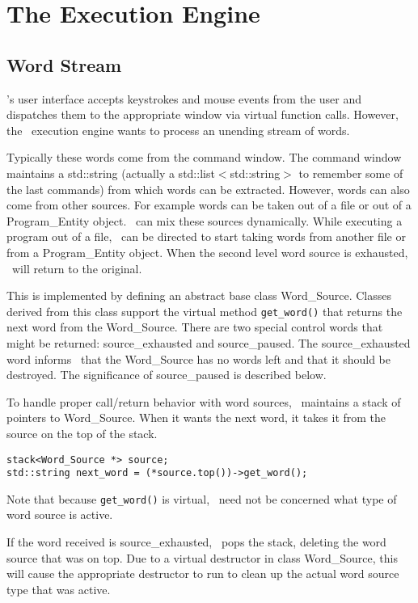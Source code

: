 \documentclass{report}
\begin{document}
\chapter{The Execution Engine}

\section{Word Stream}

\CLAC's user interface accepts keystrokes and mouse events from the user and dispatches them to
the appropriate window via virtual function calls. However, the \CLAC\ execution engine wants to
process an unending stream of words.

Typically these words come from the command window. The command window maintains a std::string
(actually a std::list$<$std::string$>$ to remember some of the last commands) from which words
can be extracted. However, words can also come from other sources. For example words can be
taken out of a file or out of a Program\_Entity object. \CLAC\ can mix these sources
dynamically. While executing a program out of a file, \CLAC\ can be directed to start taking
words from another file or from a Program\_Entity object. When the second level word source is
exhausted, \CLAC\ will return to the original.

This is implemented by defining an abstract base class Word\_Source. Classes derived from this
class support the virtual method \texttt{get\_word()} that returns the next word from the
Word\_Source. There are two special control words that might be returned: source\_exhausted and
source\_paused. The source\_exhausted word informs \CLAC\ that the Word\_Source has no words
left and that it should be destroyed. The significance of source\_paused is described below.

To handle proper call/return behavior with word sources, \CLAC\ maintains a stack of pointers to
Word\_Source. When it wants the next word, it takes it from the source on the top of the stack.

\begin{verbatim}
stack<Word_Source *> source;
std::string next_word = (*source.top())->get_word();
\end{verbatim}

Note that because \texttt{get\_word()} is virtual, \CLAC\ need not be concerned what type of
word source is active.

If the word received is source\_exhausted, \CLAC\ pops the stack, deleting the word source that
was on top. Due to a virtual destructor in class Word\_Source, this will cause the appropriate
destructor to run to clean up the actual word source type that was active.
\end{document}
